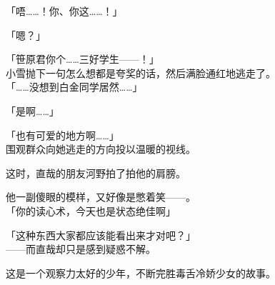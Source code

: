 「唔……！你、你这……！」

「嗯？」

「笹原君你个……三好学生——！」\\

小雪抛下一句怎么想都是夸奖的话，然后满脸通红地逃走了。\\

「……没想到白金同学居然……」

「是啊……」

「也有可爱的地方啊……」\\

围观群众向她逃走的方向投以温暖的视线。

这时，直哉的朋友河野拍了拍他的肩膀。

他一副傻眼的模样，又好像是憋着笑——。\\

「你的读心术，今天也是状态绝佳啊」

「这种东西大家都应该能看出来才对吧？」\\

——而直哉却只是感到疑惑不解。\\

\vspace{2\baselineskip}

这是一个观察力太好的少年，不断完胜毒舌冷娇少女的故事。
